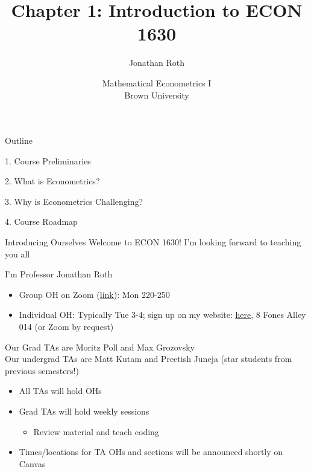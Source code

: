 \documentclass[11pt,english,handout]{beamer}
\begin{document}
\begin{frame}[noframenumbering]{}
\vspace{0.5cm}
\title[]{Chapter 1: Introduction to ECON 1630}
\author{Jonathan Roth}
\date{Mathematical Econometrics I \\ Brown University\\} 
\titlepage {\small{}\ }\thispagestyle{empty} \vspace{-30pt}

\end{frame}
 
\begin{frame}{Outline}

1. Course Preliminaries
\vspace{0.8cm}

2. What is Econometrics?
\vspace{0.8cm}

3. Why is Econometrics Challenging?
\vspace{0.8cm}

4. Course Roadmap

\end{frame}

\begin{frame}{Introducing Ourselves}
\vspace{0.2cm}
Welcome to ECON 1630! I'm looking forward to teaching you all
\vspace{0.5cm}


I'm Professor Jonathan Roth

\begin{itemize}
\item Group OH on Zoom (\href{https://brown.zoom.us/my/jonroth}{\uline{link}}): Mon 220-250 
\item Individual OH: Typically Tue 3-4; sign up on my website: \href{https://jonathandroth.github.io/OfficeHours/}{\uline{here}}, 8 Fones Alley 014 (or Zoom by request)

\end{itemize}
\vspace{0.4cm}

\pause{}

Our Grad TAs are Moritz Poll and Max Grozovsky \\

Our undergrad TAs are Matt Kutam and Preetish Juneja (star students from previous semesters!)

\begin{itemize}
	\item
	All TAs will hold OHs 
	
	\item
	Grad TAs will hold weekly sessions 
	
	\begin{itemize}
		\item 
		Review material and teach coding
	\end{itemize}
	
	\item
	Times/locations for TA OHs  and sections will be announced shortly on Canvas
\end{itemize}
 
\end{frame}
\end{document}
